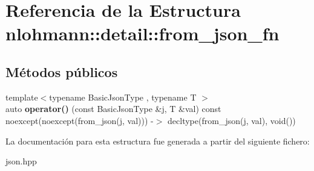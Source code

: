 \hypertarget{structnlohmann_1_1detail_1_1from__json__fn}{}\section{Referencia de la Estructura nlohmann\+:\+:detail\+:\+:from\+\_\+json\+\_\+fn}
\label{structnlohmann_1_1detail_1_1from__json__fn}
\subsection*{Métodos públicos}
\begin{DoxyCompactItemize}
\item 
\mbox{\label{structnlohmann_1_1detail_1_1from__json__fn_a6d14a74e1043072c77892534572d2973}} 
{\footnotesize template$<$typename Basic\+Json\+Type , typename T $>$ }\\auto {\bfseries operator()} (const Basic\+Json\+Type \&j, T \&val) const noexcept(noexcept(from\+\_\+json(j, val))) -\/$>$ decltype(from\+\_\+json(j, val), void())
\end{DoxyCompactItemize}


La documentación para esta estructura fue generada a partir del siguiente fichero\+:\begin{DoxyCompactItemize}
\item 
json.\+hpp\end{DoxyCompactItemize}
